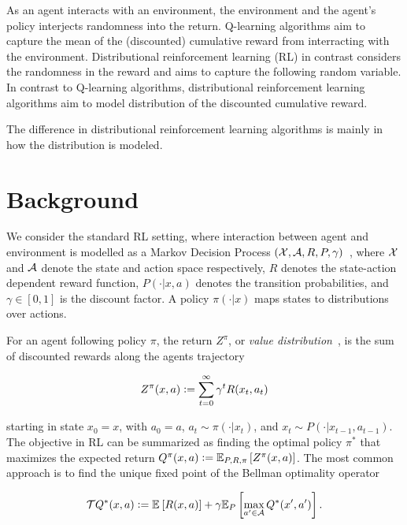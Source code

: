 \documentclass[twoside]{article}
\begin{document}

As an agent interacts with an environment, the environment and the agent's
policy interjects randomness into the return. Q-learning algorithms aim to
capture the mean of the (discounted) cumulative reward from interracting
with the environment. Distributional reinforcement learning (RL) in contrast 
considers the randomness in the reward and aims to capture the following random
variable. In contrast to Q-learning algorithms, distributional reinforcement
learning algorithms aim to model distribution of the discounted cumulative
reward.

The difference in distributional reinforcement learning algorithms is mainly in
how the distribution is modeled. 

\section{Background}

We consider the standard RL setting, where interaction between agent and
environment is modelled as a Markov Decision Process
\((\mathcal{X}, \mathcal{A}, R, P, \gamma)\)~\citep{puterman94}, where \(\mathcal{X}\) and \(\mathcal{A}\) denote
the state and action space respectively, \(R\) denotes the state-action
dependent reward function, \(P(\cdot \vert x, a)\) denotes the transition
probabilities, and \(\gamma \in [0,1]\) is the discount factor. A policy
\(\pi(\cdot \vert x)\) maps states to distributions over actions.

For an agent following policy \(\pi\), the return \(Z^\pi\),
or \emph{value distribution}~\citep{bellmare17}, is the sum of
discounted rewards along the agents trajectory

\begin{equation}
  Z^\pi(x, a) \vcentcolon= \sum_{t=0}^\infty{\gamma^t R(x_t,a_t)}
\end{equation}

\noindent
starting in state \(x_0 = x\), with \(a_0 = a\), \(a_t \sim \pi(\cdot \vert
x_t)\), and \(x_t \sim P(\cdot \vert x_{t-1}, a_{t-1})\).
The objective in RL can be summarized as finding the optimal policy \(\pi^*\)
that maximizes the expected return \(Q^\pi(x, a) \vcentcolon= \mathbb{E}_{P, R, \pi} \left[ Z^\pi(x, a) \right]
\). The most common approach is to find the unique fixed point of the Bellman
optimality operator~\citep{bellman57}

\begin{equation}
  \mathcal{T} Q^*(x, a) \vcentcolon= \mathbb{E}_{} \left[ R(x, a) \right] + \gamma \mathbb{E}_{P} \left[ \max_{a^\prime \in \mathcal{A}}
  Q^*(x^\prime, a^\prime) \right].
\end{equation}
\end{document}
